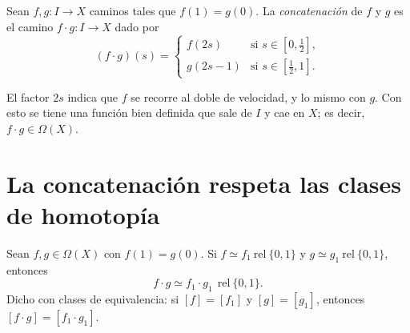 \documentclass[11pt]{article}
\begin{document}
\begin{defn}
Sean $f,g\colon I\to X$ caminos tales que $f(1)=g(0)$. La \emph{concatenación} de $f$ y $g$ es el camino $f\cdot g\colon I\to X$ dado por
\[
  (f\cdot g)(s)=
  \begin{cases}
    f(2s) & \text{si } s\in[0,\tfrac12],\\[2pt]
    g(2s-1) & \text{si } s\in[\tfrac12,1].
  \end{cases}
\]
\end{defn}

El factor $2s$ indica que $f$ se recorre al doble de velocidad, y lo mismo con $g$. Con esto se tiene una función bien definida que sale de $I$ y cae en $X$; es decir, $f\cdot g\in\Omega(X)$.

\section*{La concatenación respeta las clases de homotopía}

\begin{prop}
Sean $f,g\in\Omega(X)$ con $f(1)=g(0)$. Si $f\simeq f_1\ \mathrm{rel}\ \{0,1\}$ y $g\simeq g_1\ \mathrm{rel}\ \{0,1\}$, entonces
\[
  f\cdot g\simeq f_1\cdot g_1\ \ \mathrm{rel}\ \{0,1\}.
\]
Dicho con clases de equivalencia: si $[f]=[f_1]$ y $[g]=[g_1]$, entonces $[f\cdot g]=[f_1\cdot g_1]$.
\end{prop}
\end{document}
